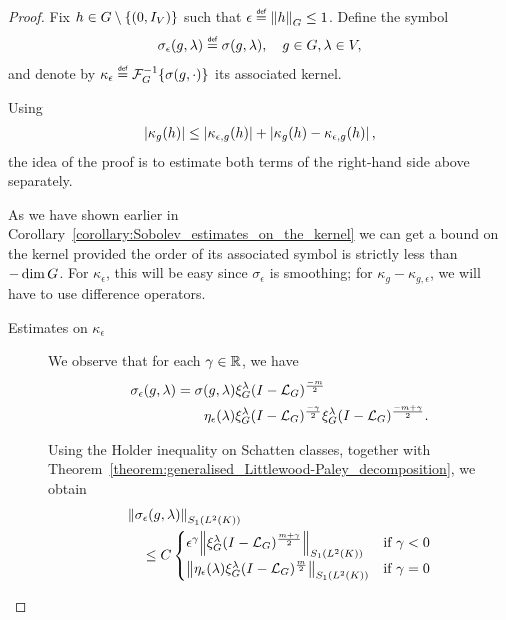 \begin{proof}
    Fix $h \in G \setminus \{(0, {I_{V}})\}$ such that $\epsilon \defeq \norm [\Group] h \leq 1$.
    Define the symbol
    \begin{align*}
        \sigma_\epsilon(g, \lambda) \defeq \sigma(g, \lambda),
        \quad g \in \Group, \lambda \in \VectorSpace,
    \end{align*}
    and denote by $\kappa_\epsilon \defeq \InverseFourier \{\sigma(g, \dummy)\}$
    its associated kernel.

    Using
    \begin{align*}
        \left|{\kappa_g(h)}\right| \leq \left|{\kappa_{\epsilon, g}(h)}\right| + \left|{\kappa_g(h) - \kappa_{\epsilon, g}(h)}\right|,
    \end{align*}
    the idea of the proof is to estimate both terms of the right-hand side above separately.

    As we have shown earlier in Corollary~\ref{corollary:Sobolev_estimates_on_the_kernel}
    we can get a bound on the kernel provided the order of its associated symbol is strictly less than $-\dim G$.
    For $\kappa_\epsilon$, this will be easy since $\sigma_\epsilon$ is smoothing;
    for $\kappa_g - \kappa_{g, \epsilon}$, we will have to use difference operators.

    \begin{description}
        \item[Estimates on $\kappa_\epsilon$]
            We observe that for each $\gamma \in \mathbb{R}$,
            we have
            \begin{align*}
                \sigma_\epsilon(g, \lambda)
                &= \sigma(g, \lambda) \xi^{\lambda}_{G} {(I - {\mathcal{L}_{G}})^\frac{-m}{2}}\\
                &\qquad \eta_\epsilon(\lambda) \xi^{\lambda}_{G} {(I - {\mathcal{L}_{G}})^\frac{-\gamma}{2}}
                \xi^{\lambda}_{G} {(I - {\mathcal{L}_{G}})^\frac{-m + \gamma}{2}}.
            \end{align*}

            Using the Holder inequality on Schatten classes,
            together with Theorem~\ref{theorem:generalised_Littlewood-Paley_decomposition},
            we obtain
            \begin{align}
                &\norm [\SchattenClasses 1 {\Lebesgue 2 \CompactGroup}] {\sigma_\epsilon(g, \lambda)} \notag\\
                &\quad \leq C
                \begin{cases}
                    \epsilon^{\gamma} \norm [\SchattenClasses 1 {\Lebesgue 2 \CompactGroup}] {\Rep \lambda \BesselPotential {m + \gamma}} & \text{if } \gamma < 0\\
                    \norm [\SchattenClasses 1 {\Lebesgue 2 \CompactGroup}] {\eta_\epsilon(\lambda) \Rep \lambda \BesselPotential {m}} & \text{if } \gamma = 0
                \end{cases}
                \label{eq:estimate_on_the_schatten_norm_of_sigma_epsilon}
            \end{align}


\end{description}
\end{proof}
